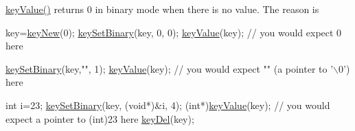 \hyperlink{group__keyvalue_ga6f29609c5da53c6dc26a98678d5752af}{key\+Value()} returns 0 in binary mode when there is no value. The reason is 
\begin{DoxyCode}
key=\hyperlink{group__key_gad23c65b44bf48d773759e1f9a4d43b89}{keyNew}(0);
\hyperlink{group__keyvalue_gaa50a5358fd328d373a45f395fa1b99e7}{keySetBinary}(key, 0, 0);
\hyperlink{group__keyvalue_ga6f29609c5da53c6dc26a98678d5752af}{keyValue}(key); \textcolor{comment}{// you would expect 0 here}

\hyperlink{group__keyvalue_gaa50a5358fd328d373a45f395fa1b99e7}{keySetBinary}(key,\textcolor{stringliteral}{""}, 1);
\hyperlink{group__keyvalue_ga6f29609c5da53c6dc26a98678d5752af}{keyValue}(key); \textcolor{comment}{// you would expect "" (a pointer to '\(\backslash\)0') here}

\textcolor{keywordtype}{int} i=23;
\hyperlink{group__keyvalue_gaa50a5358fd328d373a45f395fa1b99e7}{keySetBinary}(key, (\textcolor{keywordtype}{void}*)&i, 4);
(\textcolor{keywordtype}{int}*)\hyperlink{group__keyvalue_ga6f29609c5da53c6dc26a98678d5752af}{keyValue}(key); \textcolor{comment}{// you would expect a pointer to (int)23 here}
\hyperlink{group__key_ga3df95bbc2494e3e6703ece5639be5bb1}{keyDel}(key);
\end{DoxyCode}


